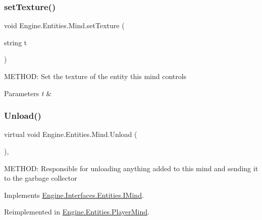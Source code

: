 \subsubsection{\texorpdfstring{set\+Texture()}{setTexture()}}
{\footnotesize\ttfamily void Engine.\+Entities.\+Mind.\+set\+Texture (\begin{DoxyParamCaption}\item[{string}]{t }\end{DoxyParamCaption})\hspace{0.3cm}{\ttfamily [inline]}}



M\+E\+T\+H\+OD\+: Set the texture of the entity this mind controls 


\begin{DoxyParams}{Parameters}
{\em t} & \\
\hline
\end{DoxyParams}
\mbox{\label{a00318_a15bf25a4a74706ef37592689f43c0598}} 
\subsubsection{\texorpdfstring{Unload()}{Unload()}}
{\footnotesize\ttfamily virtual void Engine.\+Entities.\+Mind.\+Unload (\begin{DoxyParamCaption}{ }\end{DoxyParamCaption})\hspace{0.3cm}{\ttfamily [inline]}, {\ttfamily [virtual]}}



M\+E\+T\+H\+OD\+: Responsible for unloading anything added to this mind and sending it to the garbage collector 



Implements \hyperlink{a00446_a142493645e36a3e14c7d3c59793c4d3c}{Engine.\+Interfaces.\+Entities.\+I\+Mind}.



Reimplemented in \hyperlink{a00326_a80bacdc33e51129afed33f9e8bd5cd0f}{Engine.\+Entities.\+Player\+Mind}.

\mbox{\label{a00318_adec6999d87accf7371de1536eac2541b}} 

